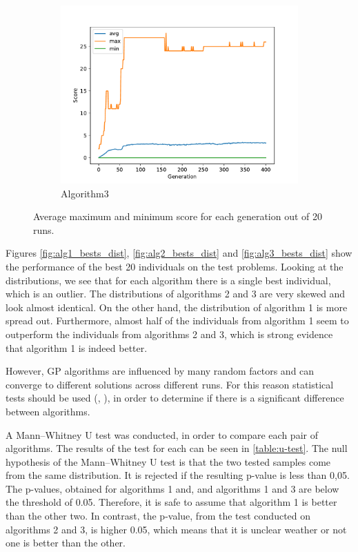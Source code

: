 \documentclass[12pt,a4paper]{article}
\begin{document}
\begin{figure}[h!]
\begin{subfigure}{.33\textwidth}
				\includegraphics[width=\linewidth]{../code/plots/alg3_score}
				\caption{Algorithm3}
				\label{fig:alg3_score}
			\end{subfigure}
			
			\caption{Average maximum and minimum score for each generation out of 20 runs.}
			\label{fig:score}
		\end{figure}
		Figures \autoref{fig:alg1_bests_dist}, \autoref{fig:alg2_bests_dist} and \autoref{fig:alg3_bests_dist} show the performance of the best 20 individuals on the test problems. Looking at the distributions, we see that for each algorithm there is a single best individual, which is an outlier. The distributions of algorithms 2 and 3 are very skewed and look almost identical. On the other hand, the distribution of algorithm 1 is more spread out. Furthermore, almost half of the individuals from algorithm 1 seem to outperform the individuals from algorithms 2 and 3, which is strong evidence that algorithm 1 is indeed better.
		
		However, GP algorithms are influenced by many random factors and can converge to different solutions across different runs. For this reason statistical tests should be used (\cite{arcuri_practical_2011}, \cite{derrac_practical_2011}), in order to determine if there is a significant difference between algorithms.
		
		A Mann–Whitney U test was conducted, in order to compare each pair of algorithms. The results of the test for each can be seen in \autoref{table:u-test}. The null hypothesis of the Mann–Whitney U test is that the two tested samples come from the same distribution. It is rejected if the resulting p-value is less than 0,05. The p-values, obtained for algorithms 1 and, and algorithms 1 and 3 are below the threshold of 0.05. Therefore, it is safe to assume that algorithm 1 is better than the other two. In contrast, the p-value, from the test conducted on algorithms 2 and 3, is higher 0.05, which means that it is unclear weather or not one is better than the other.  
		
\end{document}
